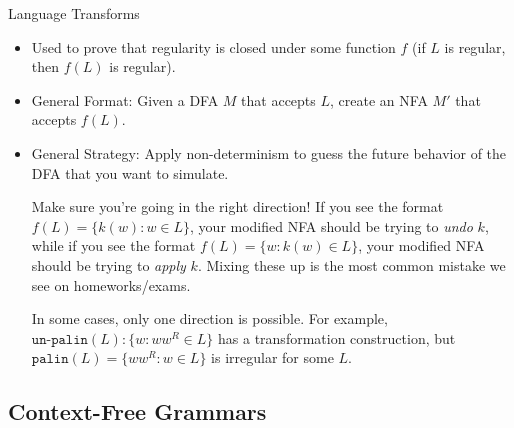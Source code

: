 \documentclass{beamer}
\begin{document}
\begin{frame}[t]{Language Transforms}
    \begin{itemize}
        \item Used to prove that regularity is closed under some function $f$ (if $L$ is regular, then $f(L)$ is regular).
        \item \alert{General Format:} Given a DFA $M$ that accepts $L$, create an NFA $M'$ that accepts $f(L)$.
        \item \pause \alert{General Strategy:} Apply non-determinism to guess the future behavior of the DFA that you want to simulate.\pause
        \vspace{1 cm}
        \begin{alertblock}{Make sure you're going in the right direction!}
            If you see the format $f(L) = \{k(w) : w \in L\}$, your modified NFA should be trying to \textit{undo} $k$, while if you see the format $f(L) = \{w : k(w) \in L\}$, your modified NFA should be trying to \textit{apply} $k$. Mixing these up is the most common mistake we see on homeworks/exams.

            \vspace{.25cm}
            
            In some cases, only one direction is possible. For example, $\texttt{un-palin}(L): \{w : ww^R \in L\}$ has a transformation construction, but $\texttt{palin}(L) = \{ww^R: w \in L\}$ is irregular for some $L$.
        \end{alertblock}
    \end{itemize}
\end{frame}

\subsection{Context-Free Grammars}
\end{document}
